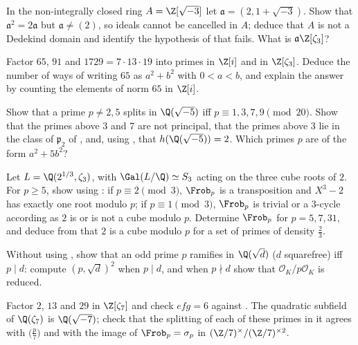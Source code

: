 \begin{exercise}\label{ex:ant:ex-sqrtminus3}
In the non-integrally closed ring $A=\Z[\sqrt{-3}]$ let $\mathfrak a=(2,1+\sqrt{-3})$. Show that $\mathfrak a^2=2\mathfrak a$ but $\mathfrak a\ne(2)$, so ideals cannot be
cancelled in $A$; deduce that $A$ is not a Dedekind domain and identify the hypothesis of  that fails. What is $\mathfrak a\Z[\zeta_3]$?
\end{exercise}

\begin{exercise}\label{ex:ant:ex-factor}
Factor $65$, $91$ and $1729=7\cdot13\cdot19$ into primes in $\Z[i]$ and in $\Z[\zeta_3]$. Deduce the number of ways of writing $65$ as $a^2+b^2$ with $0<a<b$, and
explain the answer by counting the elements of norm $65$ in $\Z[i]$.
\end{exercise}

\begin{exercise}\label{ex:ant:ex-sqrtminus5}
Show that a prime $p\ne2,5$ splits in $\Q(\sqrt{-5})$ iff $p\equiv1,3,7,9\pmod{20}$. Show that the primes above $3$ and $7$ are not principal, that the
primes above $3$ lie in the class of $\mathfrak p_2$ of , and, using , that $h(\Q(\sqrt{-5}))=2$. Which primes $p$
are of the form $a^2+5b^2$?
\end{exercise}

\begin{exercise}\label{ex:ant:ex-cubic}
Let $L=\Q(2^{1/3},\zeta_3)$, with $\Gal(L/\Q)\simeq S_3$ acting on the three cube roots of $2$. For $p\ge5$, show using : if $p\equiv2\pmod3$,
$\Frob_p$ is a transposition and $X^3-2$ has exactly one root modulo $p$; if $p\equiv1\pmod3$, $\Frob_p$ is trivial or a $3$-cycle according as $2$ is or is not a
cube modulo $p$. Determine $\Frob_p$ for $p=5,7,31$, and deduce from  that $2$ is a cube modulo $p$ for a set of primes of density $\frac23$.
\end{exercise}

\begin{exercise}\label{ex:ant:ex-ramify}
Without using , show that an odd prime $p$ ramifies in $\Q(\sqrt d)$ ($d$ squarefree) iff $p\mid d$: compute $(p,\sqrt d)^2$ when $p\mid d$,
and when $p\nmid d$ show that $\mathcal O_K/p\mathcal O_K$ is reduced.
\end{exercise}

\begin{exercise}\label{ex:ant:ex-zeta7}
Factor $2$, $13$ and $29$ in $\Z[\zeta_7]$ and check $efg=6$ against . The quadratic subfield of $\Q(\zeta_7)$ is $\Q(\sqrt{-7})$; check that
the splitting of each of these primes in it agrees with $\bigl(\frac p7\bigr)$ and with the image of $\Frob_p=\sigma_p$ in $(\Z/7)^\times/(\Z/7)^{\times2}$.
\end{exercise}

